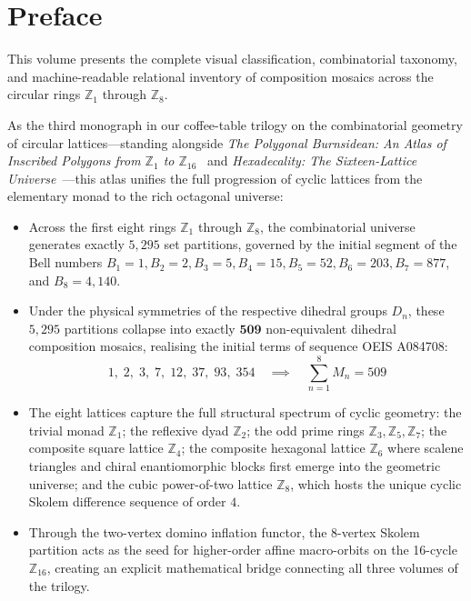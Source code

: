 \chapter*{Preface}

This volume presents the complete visual classification, combinatorial taxonomy, and machine-readable relational inventory of composition mosaics across the circular rings $\mathbb{Z}_1$ through $\mathbb{Z}_8$.

As the third monograph in our coffee-table trilogy on the combinatorial geometry of circular lattices---standing alongside \emph{The Polygonal Burnsidean: An Atlas of Inscribed Polygons from $\mathbb{Z}_1$ to $\mathbb{Z}_{16}$}~\cite{KneeVitti2026poly} and \emph{Hexadecality: The Sixteen-Lattice Universe}~\cite{KneeVitti2026hex}---this atlas unifies the full progression of cyclic lattices from the elementary monad to the rich octagonal universe:
\begin{itemize}
    \item Across the first eight rings $\mathbb{Z}_1$ through $\mathbb{Z}_8$, the combinatorial universe generates exactly $5{,}295$ set partitions, governed by the initial segment of the Bell numbers $B_1 = 1, B_2 = 2, B_3 = 5, B_4 = 15, B_5 = 52, B_6 = 203, B_7 = 877$, and $B_8 = 4{,}140$.
    \item Under the physical symmetries of the respective dihedral groups $D_n$, these $5{,}295$ partitions collapse into exactly $\mathbf{509}$ non-equivalent dihedral composition mosaics, realising the initial terms of sequence OEIS A084708:
    \begin{equation*}
    1, \; 2, \; 3, \; 7, \; 12, \; 37, \; 93, \; 354 \quad \implies \quad \sum_{n=1}^8 M_n = 509
    \end{equation*}
    \item The eight lattices capture the full structural spectrum of cyclic geometry: the trivial monad $\mathbb{Z}_1$; the reflexive dyad $\mathbb{Z}_2$; the odd prime rings $\mathbb{Z}_3, \mathbb{Z}_5, \mathbb{Z}_7$; the composite square lattice $\mathbb{Z}_4$; the composite hexagonal lattice $\mathbb{Z}_6$ where scalene triangles and chiral enantiomorphic blocks first emerge into the geometric universe; and the cubic power-of-two lattice $\mathbb{Z}_8$, which hosts the unique cyclic Skolem difference sequence of order $4$.
    \item Through the two-vertex domino inflation functor, the 8-vertex Skolem partition acts as the seed for higher-order affine macro-orbits on the 16-cycle $\mathbb{Z}_{16}$, creating an explicit mathematical bridge connecting all three volumes of the trilogy.
\end{itemize}

